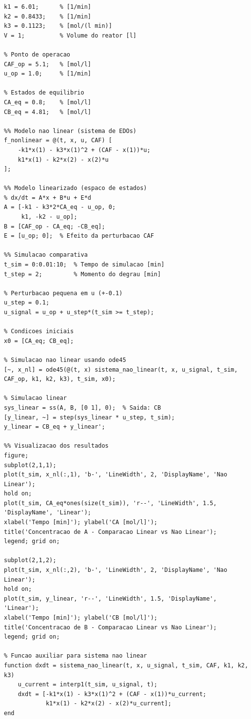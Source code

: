 \documentclass[a4paper,12pt]{article}
\begin{document}
\begin{lstlisting}[caption=Codigo MATLAB para simulacao comparativa]
%% Parametros do processo
k1 = 6.01;      % [1/min]
k2 = 0.8433;    % [1/min] 
k3 = 0.1123;    % [mol/(l min)]
V = 1;          % Volume do reator [l]

% Ponto de operacao
CAF_op = 5.1;   % [mol/l]
u_op = 1.0;     % [1/min]

% Estados de equilibrio
CA_eq = 0.8;    % [mol/l]
CB_eq = 4.81;   % [mol/l]

%% Modelo nao linear (sistema de EDOs)
f_nonlinear = @(t, x, u, CAF) [
    -k1*x(1) - k3*x(1)^2 + (CAF - x(1))*u;
    k1*x(1) - k2*x(2) - x(2)*u
];

%% Modelo linearizado (espaco de estados)
% dx/dt = A*x + B*u + E*d
A = [-k1 - k3*2*CA_eq - u_op, 0;
     k1, -k2 - u_op];
B = [CAF_op - CA_eq; -CB_eq];
E = [u_op; 0];  % Efeito da perturbacao CAF

%% Simulacao comparativa
t_sim = 0:0.01:10;  % Tempo de simulacao [min]
t_step = 2;         % Momento do degrau [min]

% Perturbacao pequena em u (+-0.1)
u_step = 0.1;
u_signal = u_op + u_step*(t_sim >= t_step);

% Condicoes iniciais
x0 = [CA_eq; CB_eq];

% Simulacao nao linear usando ode45
[~, x_nl] = ode45(@(t, x) sistema_nao_linear(t, x, u_signal, t_sim, CAF_op, k1, k2, k3), t_sim, x0);

% Simulacao linear
sys_linear = ss(A, B, [0 1], 0);  % Saida: CB
[y_linear, ~] = step(sys_linear * u_step, t_sim);
y_linear = CB_eq + y_linear';

%% Visualizacao dos resultados
figure;
subplot(2,1,1);
plot(t_sim, x_nl(:,1), 'b-', 'LineWidth', 2, 'DisplayName', 'Nao Linear');
hold on;
plot(t_sim, CA_eq*ones(size(t_sim)), 'r--', 'LineWidth', 1.5, 'DisplayName', 'Linear');
xlabel('Tempo [min]'); ylabel('CA [mol/l]');
title('Concentracao de A - Comparacao Linear vs Nao Linear');
legend; grid on;

subplot(2,1,2);
plot(t_sim, x_nl(:,2), 'b-', 'LineWidth', 2, 'DisplayName', 'Nao Linear');
hold on;
plot(t_sim, y_linear, 'r--', 'LineWidth', 1.5, 'DisplayName', 'Linear');
xlabel('Tempo [min]'); ylabel('CB [mol/l]');
title('Concentracao de B - Comparacao Linear vs Nao Linear');
legend; grid on;

% Funcao auxiliar para sistema nao linear
function dxdt = sistema_nao_linear(t, x, u_signal, t_sim, CAF, k1, k2, k3)
    u_current = interp1(t_sim, u_signal, t);
    dxdt = [-k1*x(1) - k3*x(1)^2 + (CAF - x(1))*u_current;
            k1*x(1) - k2*x(2) - x(2)*u_current];
end
\end{lstlisting}
\end{document}
